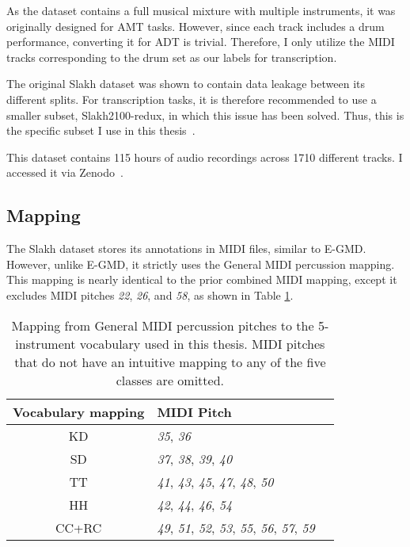 As the dataset contains a full musical mixture with multiple instruments, it was originally designed for \gls{AMT} tasks. However, since each track includes a drum performance, converting it for \gls{ADT} is trivial. Therefore, I only utilize the MIDI tracks corresponding to the drum set as our labels for transcription.

The original Slakh dataset was shown to contain data leakage between its different splits. For transcription tasks, it is therefore recommended to use a smaller subset, Slakh2100-redux, in which this issue has been solved. Thus, this is the specific subset I use in this thesis~\cite{manilow_2019_4599666}.

This dataset contains 115 hours of audio recordings across 1710 different tracks. I accessed it via Zenodo~\cite{manilow_2019_4599666}.

\subsection{Mapping}

The Slakh dataset stores its annotations in MIDI files, similar to E-GMD. However, unlike E-GMD, it strictly uses the General MIDI percussion mapping. This mapping is nearly identical to the prior combined MIDI mapping, except it excludes MIDI pitches \textit{22}, \textit{26}, and \textit{58}, as shown in Table \ref{MIDIMapping}.

\begin{table}[H]
    \centering
    \hspace*{-0.6cm}
    \begin{tabular}{c|ll}
        Vocabulary mapping & MIDI Pitch \\
        \hline
        \acrfull{KD} & \textit{35}, \textit{36} \\
        \acrfull{SD} & \textit{37}, \textit{38}, \textit{39}, \textit{40} \\
        \acrfull{TT} & \textit{41}, \textit{43}, \textit{45}, \textit{47}, \textit{48}, \textit{50} \\
        \acrfull{HH} & \textit{42}, \textit{44}, \textit{46}, \textit{54} \\
        \acrfull{CC+RC} & \textit{49}, \textit{51}, \textit{52}, \textit{53}, \textit{55}, \textit{56}, \textit{57}, \textit{59} \\
    \end{tabular}
    \caption{Mapping from General MIDI percussion pitches to the 5-instrument vocabulary used in this thesis. MIDI pitches that do not have an intuitive mapping to any of the five classes are omitted.}
    \label{MIDIMapping}
\end{table}

